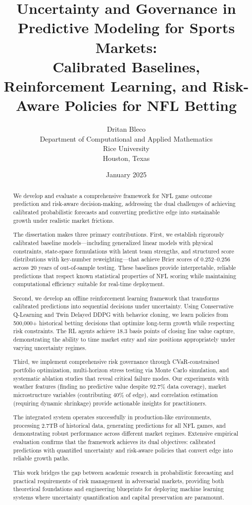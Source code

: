 \documentclass[12pt,letterpaper]{report}
\title{%
  \textbf{Uncertainty and Governance in Predictive Modeling for Sports Markets:} \\[0.5em]
  \large Calibrated Baselines, Reinforcement Learning, and Risk-Aware Policies for NFL Betting
}
\author{
  Dritan Bleco \\[0.5em]
  \small Department of Computational and Applied Mathematics \\
  \small Rice University \\
  \small Houston, Texas
}
\date{January 2025}
\theoremstyle{definition}
\begin{document}
\maketitle

\newpage
\begin{abstract}
We develop and evaluate a comprehensive framework for NFL game outcome prediction and risk-aware decision-making, addressing the dual challenges of achieving calibrated probabilistic forecasts and converting predictive edge into sustainable growth under realistic market frictions.

The dissertation makes three primary contributions. First, we establish rigorously calibrated baseline models—including generalized linear models with physical constraints, state-space formulations with latent team strengths, and structured score distributions with key-number reweighting—that achieve Brier scores of 0.252–0.256 across 20 years of out-of-sample testing. These baselines provide interpretable, reliable predictions that respect known statistical properties of NFL scoring while maintaining computational efficiency suitable for real-time deployment.

Second, we develop an offline reinforcement learning framework that transforms calibrated predictions into sequential decisions under uncertainty. Using Conservative Q-Learning and Twin Delayed DDPG with behavior cloning, we learn policies from 500,000+ historical betting decisions that optimize long-term growth while respecting risk constraints. The RL agents achieve 18.3 basis points of closing line value capture, demonstrating the ability to time market entry and size positions appropriately under varying uncertainty regimes.

Third, we implement comprehensive risk governance through CVaR-constrained portfolio optimization, multi-horizon stress testing via Monte Carlo simulation, and systematic ablation studies that reveal critical failure modes. Our experiments with weather features (finding no predictive value despite 92.7\% data coverage), market microstructure variables (contributing 40\% of edge), and correlation estimation (requiring dynamic shrinkage) provide actionable insights for practitioners.

The integrated system operates successfully in production-like environments, processing 2.7TB of historical data, generating predictions for all NFL games, and demonstrating robust performance across different market regimes. Extensive empirical evaluation confirms that the framework achieves its dual objectives: calibrated predictions with quantified uncertainty and risk-aware policies that convert edge into reliable growth paths.

This work bridges the gap between academic research in probabilistic forecasting and practical requirements of risk management in adversarial markets, providing both theoretical foundations and engineering blueprints for deploying machine learning systems where uncertainty quantification and capital preservation are paramount.
\end{abstract}
\end{document}
